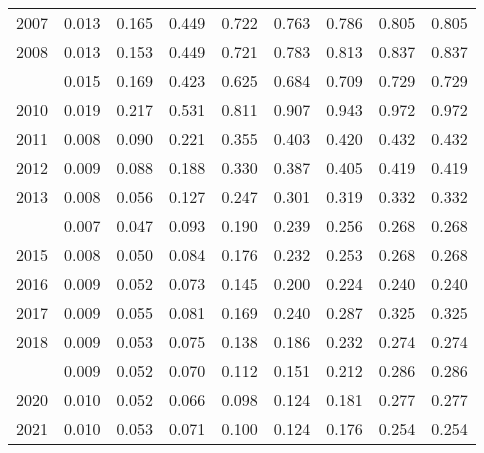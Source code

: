 \documentclass[
]{article}
\begin{document}
\begin{longtable}[t]{lrrrrrrrr}
2007 & 0.013 & 0.165 & 0.449 & 0.722 & 0.763 & 0.786 & 0.805 & 0.805\\
2008 & 0.013 & 0.153 & 0.449 & 0.721 & 0.783 & 0.813 & 0.837 & 0.837\\
\addlinespace
2009 & 0.015 & 0.169 & 0.423 & 0.625 & 0.684 & 0.709 & 0.729 & 0.729\\
2010 & 0.019 & 0.217 & 0.531 & 0.811 & 0.907 & 0.943 & 0.972 & 0.972\\
2011 & 0.008 & 0.090 & 0.221 & 0.355 & 0.403 & 0.420 & 0.432 & 0.432\\
2012 & 0.009 & 0.088 & 0.188 & 0.330 & 0.387 & 0.405 & 0.419 & 0.419\\
2013 & 0.008 & 0.056 & 0.127 & 0.247 & 0.301 & 0.319 & 0.332 & 0.332\\
\addlinespace
2014 & 0.007 & 0.047 & 0.093 & 0.190 & 0.239 & 0.256 & 0.268 & 0.268\\
2015 & 0.008 & 0.050 & 0.084 & 0.176 & 0.232 & 0.253 & 0.268 & 0.268\\
2016 & 0.009 & 0.052 & 0.073 & 0.145 & 0.200 & 0.224 & 0.240 & 0.240\\
2017 & 0.009 & 0.055 & 0.081 & 0.169 & 0.240 & 0.287 & 0.325 & 0.325\\
2018 & 0.009 & 0.053 & 0.075 & 0.138 & 0.186 & 0.232 & 0.274 & 0.274\\
\addlinespace
2019 & 0.009 & 0.052 & 0.070 & 0.112 & 0.151 & 0.212 & 0.286 & 0.286\\
2020 & 0.010 & 0.052 & 0.066 & 0.098 & 0.124 & 0.181 & 0.277 & 0.277\\
2021 & 0.010 & 0.053 & 0.071 & 0.100 & 0.124 & 0.176 & 0.254 & 0.254\\*
\end{longtable}
\end{document}

